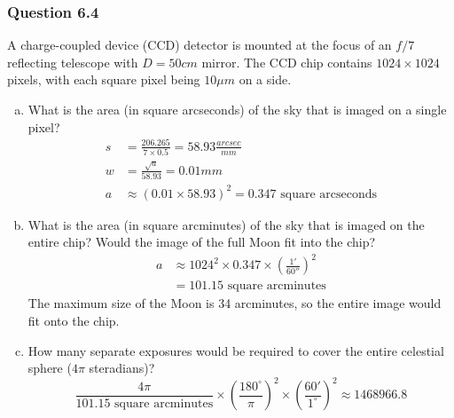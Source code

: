 \documentclass{math}
\begin{document}
\subsubsection*{Question 6.4}
A charge-coupled device (CCD) detector is mounted at the focus of an \( f/7 \)
reflecting telescope with \( D = 50cm \) mirror. The CCD chip contains
\( 1024\times1024 \) pixels, with each square pixel being \( 10\mu m \) on a
side.
\begin{enumerate}[(a)]
  \item What is the area (in square arcseconds) of the sky that is imaged on
    a single pixel?
  \begin{align*}
    s &= \frac{206.265}{7\times0.5} = 58.93\frac{arcsec}{mm} \\
    w &= \frac{\sqrt{a}}{58.93} = 0.01mm \\
    a &\approx (0.01\times58.93)^2 = 0.347\text{ square arcseconds}
  \end{align*}
  \item What is the area (in square arcminutes) of the sky that is imaged on
    the entire chip? Would the image of the full Moon fit into the chip?
  \begin{align*}
    a &\approx 1024^2\times0.347\times\left(\frac{1'}{60''}\right)^2 \\
    &= 101.15\text{ square arcminutes}
  \end{align*}
  The maximum size of the Moon is 34 arcminutes, so the entire image would
  fit onto the chip.
  \item How many separate exposures would be required to cover the entire
    celestial sphere (\( 4\pi \) steradians)?
  \[ \frac{4\pi}{101.15\text{ square arcminutes}}\times
    (\frac{180^{\circ}}{\pi})^2\times(\frac{60'}{1^{\circ}})^2 \approx
    1468966.8 \]
\end{enumerate}
\end{document}
